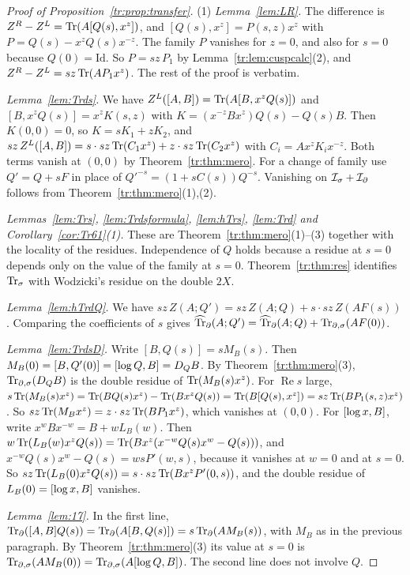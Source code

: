 \begin{proof}[Proof of Proposition~\ref{tr:prop:transfer}]
(1) \emph{Lemma~\ref{lem:LR}.} The difference is \(Z^R-Z^L=\operatorname{Tr}(A[Q(s),x^z])\),
and \([Q(s),x^z]=P(s,z)x^z\) with \(P=Q(s)-x^zQ(s)x^{-z}\). The family \(P\)
vanishes for \(z=0\), and also for \(s=0\) because \(Q(0)=\mathrm{Id}\). So
\(P=sz\,P_1\) by Lemma~\ref{tr:lem:cuspcalc}(2), and
\(Z^R-Z^L=sz\operatorname{Tr}(AP_1x^z)\). The rest of the proof is verbatim.

\emph{Lemma~\ref{lem:Trds}.} We have
\(Z^L([A,B])=\operatorname{Tr}(A[B,x^zQ(s)])\) and \([B,x^zQ(s)]=x^zK(s,z)\) with
\(K=(x^{-z}Bx^z)Q(s)-Q(s)B\). Then \(K(0,0)=0\), so \(K=sK_1+zK_2\), and
\(sz\,Z^L([A,B])=s\cdot sz\operatorname{Tr}(C_1x^z)+z\cdot sz\operatorname{Tr}(C_2x^z)\) with
\(C_i=Ax^zK_ix^{-z}\). Both terms vanish at \((0,0)\) by
Theorem~\ref{tr:thm:mero}. For a change of family use \(Q'=Q+sF\) in place
of \(Q'^{-s}=(1+sC(s))Q^{-s}\). Vanishing on \(\mathcal I_\sigma+\mathcal I_\partial\) follows from
Theorem~\ref{tr:thm:mero}(1),(2).

\emph{Lemmas~\ref{lem:Trs}, \ref{lem:Trdsformula}, \ref{lem:hTrs},
\ref{lem:Trd} and Corollary~\ref{cor:Tr61}(1).} These are
Theorem~\ref{tr:thm:mero}(1)--(3) together with the locality of the
residues. Independence of \(Q\) holds because a residue at \(s=0\) depends
only on the value of the family at \(s=0\). Theorem~\ref{tr:thm:res}
identifies \(\operatorname{Tr}_\sigma\) with Wodzicki's residue on the double \(2X\).

\emph{Lemma~\ref{lem:hTrdQ}.} We have \(sz\,Z(A;Q')=sz\,Z(A;Q)+s\cdot
sz\,Z(AF(s))\). Comparing the coefficients of \(s\) gives
\(\widehat{\operatorname{Tr}}_\partial(A;Q')=\widehat{\operatorname{Tr}}_\partial(A;Q)+\operatorname{Tr}_{\partial,\sigma}(AF(0))\).

\emph{Lemma~\ref{lem:TrdsD}.} Write \([B,Q(s)]=sM_B(s)\). Then
\(M_B(0)=[B,Q'(0)]=[\log Q,B]=D_QB\). By Theorem~\ref{tr:thm:mero}(3),
\(\operatorname{Tr}_{\partial,\sigma}(D_QB)\) is the double residue of \(\operatorname{Tr}(M_B(s)x^z)\). For
\(\operatorname{Re}s\) large, \(s\operatorname{Tr}(M_B(s)x^z)=\operatorname{Tr}(BQ(s)x^z)-\operatorname{Tr}(Bx^zQ(s))
=\operatorname{Tr}(B[Q(s),x^z])=sz\operatorname{Tr}(BP_1(s,z)x^z)\). So \(sz\operatorname{Tr}(M_Bx^z)=z\cdot
sz\operatorname{Tr}(BP_1x^z)\), which vanishes at \((0,0)\). For
\([\log x,B]\), write \(x^wBx^{-w}=B+wL_B(w)\). Then
\(w\operatorname{Tr}(L_B(w)x^zQ(s))=\operatorname{Tr}(Bx^z(x^{-w}Q(s)x^w-Q(s)))\), and
\(x^{-w}Q(s)x^w-Q(s)=wsP'(w,s)\), because it vanishes at \(w=0\) and at
\(s=0\). So \(sz\operatorname{Tr}(L_B(0)x^zQ(s))=s\cdot sz\operatorname{Tr}(Bx^zP'(0,s))\), and the
double residue of \(L_B(0)=[\log x,B]\) vanishes.

\emph{Lemma~\ref{lem:17}.} In the first line,
\(\operatorname{Tr}_\partial([A,B]Q(s))=\operatorname{Tr}_\partial(A[B,Q(s)])=s\operatorname{Tr}_\partial(AM_B(s))\), with \(M_B\) as in the
previous paragraph. By Theorem~\ref{tr:thm:mero}(3) its value at \(s=0\) is
\(\operatorname{Tr}_{\partial,\sigma}(AM_B(0))=\operatorname{Tr}_{\partial,\sigma}(A[\log Q,B])\). The second line does not involve \(Q\).


\end{proof}
